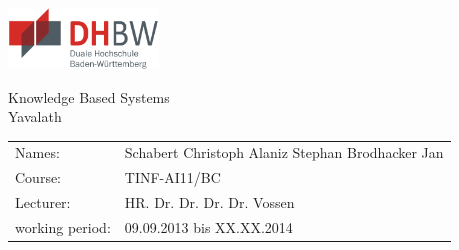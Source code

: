 \documentclass[german]{report}
\begin{document}
\pagestyle{fancy}

\rfoot{\thepage}
\fancyhfoffset{\marginparsep}
\renewcommand{\footrulewidth}{1.0pt}
\renewcommand{\headrulewidth}{1.0pt}
\renewcommand{\headheight}{30pt}





\begin{titlepage}

\begin{flushright}
    \includegraphics*[width=4.0cm]{abbildungen/dhbwlogo} \\ 
\end{flushright}
\begin{center}
\vspace{1.5cm}
\Huge{ \textsf{Knowledge Based Systems}} \\
	Yavalath\\
    \vspace{4cm}
 \normalsize{
    \begin{tabular}{ll}
    	Names: & {Schabert Christoph  Alaniz Stephan  Brodhacker Jan} \\
    	Course: & {TINF-AI11/BC}	\\
    	Lecturer: &  HR. Dr. Dr. Dr. Dr. Vossen\\
    	working period: & 09.09.2013 bis XX.XX.2014
    \end{tabular}\\
    }
\end{center}

\end{titlepage}

\newpage
\end{document}
